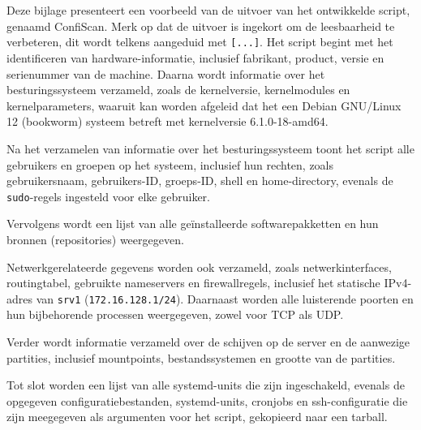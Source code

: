 
\chapter{}%
\label{ch:bijlage_confiscan}

Deze bijlage presenteert een voorbeeld van de uitvoer van het ontwikkelde script, genaamd ConfiScan.
Merk op dat de uitvoer is ingekort om de leesbaarheid te verbeteren, dit wordt telkens aangeduid met \texttt{[...]}.
Het script begint met het identificeren van hardware-informatie, inclusief fabrikant, product, versie en serienummer van de machine.
Daarna wordt informatie over het besturingssysteem verzameld, zoals de kernelversie, kernelmodules en kernelparameters, waaruit kan worden afgeleid dat het een Debian GNU/Linux 12 (bookworm) systeem betreft met kernelversie 6.1.0-18-amd64.

Na het verzamelen van informatie over het besturingssysteem toont het script alle gebruikers en groepen op het systeem, inclusief hun rechten, zoals gebruikersnaam, gebruikers-ID, groeps-ID, shell en home-directory, evenals de \texttt{sudo}-regels ingesteld voor elke gebruiker.

Vervolgens wordt een lijst van alle ge\"installeerde softwarepakketten en hun bronnen (repositories) weergegeven.

Netwerkgerelateerde gegevens worden ook verzameld, zoals netwerkinterfaces, routingtabel, gebruikte nameservers en firewallregels, inclusief het statische IPv4-adres van \texttt{srv1} (\texttt{172.16.128.1/24}).
Daarnaast worden alle luisterende poorten en hun bijbehorende processen weergegeven, zowel voor TCP als UDP.

Verder wordt informatie verzameld over de schijven op de server en de aanwezige partities, inclusief mountpoints, bestandssystemen en grootte van de partities.

Tot slot worden een lijst van alle systemd-units die zijn ingeschakeld, evenals de opgegeven configuratiebestanden, systemd-units, cronjobs en ssh-configuratie die zijn meegegeven als argumenten voor het script, gekopieerd naar een tarball.

